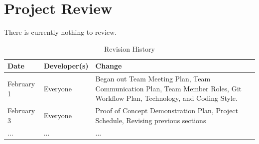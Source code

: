 \documentclass{article}
\begin{document}
\clearpage

\section{Project Review}

There is currently nothing to review.

\newpage

\begin{table}[hp]
\caption{Revision History} \label{TblRevisionHistory}
\begin{tabularx}{\textwidth}{llX}
\toprule
\textbf{Date} & \textbf{Developer(s)} & \textbf{Change}\\
\midrule
February 1 & Everyone & Began out Team Meeting Plan, Team Communication Plan, Team Member Roles, Git Workflow Plan, Technology, and Coding Style. \\
February 3 & Everyone & Proof of Concept Demonstration Plan, Project Schedule, Revising previous sections\\ 
... & ... & ...\\
\bottomrule
\end{tabularx}
\end{table}
\end{document}
